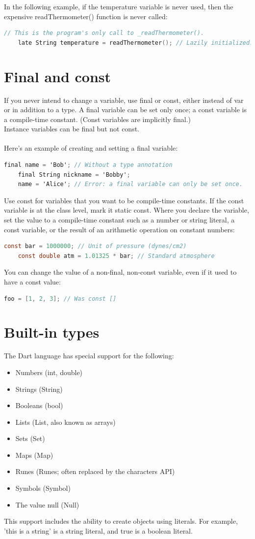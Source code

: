 In the following example, if the temperature variable is never used, then the expensive readThermometer() function is never called:
\begin{lstlisting}[language=C]
	// This is the program's only call to _readThermometer().
	late String temperature = readThermometer(); // Lazily initialized.
\end{lstlisting}
\section{Final and const}
If you never intend to change a variable, use final or const, either instead of var or in addition to a type. A final variable can be set only once; a const variable is a compile-time constant. (Const variables are implicitly final.)
\\Instance variables can be final but not const.
\\\\Here's an example of creating and setting a final variable:
\begin{lstlisting}[language=C]
	final name = 'Bob'; // Without a type annotation
	final String nickname = 'Bobby';
	name = 'Alice'; // Error: a final variable can only be set once.
\end{lstlisting}

Use const for variables that you want to be compile-time constants. If the const variable is at the class level, mark it static const. Where you declare the variable, set the value to a compile-time constant such as a number or string literal, a const variable, or the result of an arithmetic operation on constant numbers:

\begin{lstlisting}[language=C]
	const bar = 1000000; // Unit of pressure (dynes/cm2)
	const double atm = 1.01325 * bar; // Standard atmosphere
\end{lstlisting}
You can change the value of a non-final, non-const variable, even if it used to have a const value:
\begin{lstlisting}[language=C]
	foo = [1, 2, 3]; // Was const []
\end{lstlisting}
\section{Built-in types}
The Dart language has special support for the following:
\begin{itemize}
\item Numbers (int, double)
\item Strings (String)
\item Booleans (bool)
\item Lists (List, also known as arrays)
\item Sets (Set)
\item Maps (Map)
\item Runes (Runes; often replaced by the characters API)
\item Symbols (Symbol)
\item The value null (Null)
\end{itemize}
This support includes the ability to create objects using literals. For example, 'this is a string' is a string literal, and true is a boolean literal.

